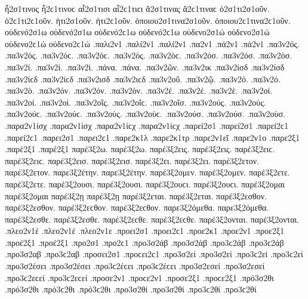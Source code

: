 {ἧ2σ1τινος ἧ2ϲ1τινοϲ   %
αἷ2σ1τισι αἷ2ϲ1τιϲι   %
ἅ2σ1τινας ἅ2ϲ1τιναϲ   %
ὁ2σ1τι2σ1οῦν. ὁ2ϲ1τι2ϲ1οῦν.   %
ἡτι2σ1οῦν. ἡτι2ϲ1οῦν.   %
ὁποιου2σ1τινα2σ1οῦν. ὁποιου2ϲ1τινα2ϲ1οῦν.   %
οὐδενό2σ1ω οὐδενό2σ1ω οὐδενό2ϲ1ω οὐδενό2ϲ1ω   %
οὐδενο2σ1ώ οὐδενο2σ1ώ οὐδενο2ϲ1ώ οὐδενο2ϲ1ώ 
.παλι2ν1   %
.παλί2ν1 .παλί2ν1   %
.πα2ν1 
.πά2ν1 .πά2ν1 
.πα3ν2ός. .πα3ν2ός. .πα3ν2όϲ. .πα3ν2όϲ.   %
.πα3ν2ὸς. .πα3ν2ὸϲ. 
.πα3ν2όσ. .πα3ν2όσ. 
.πα3ν2ὸσ. 
.πα3ν2ί. .πα3ν2ί. 
.πα3ν2ὶ. 
.πάνα. .πάνα. 
.πα3ν2ῶν. 
.πα3ν2ικ   %
.πα3ν2ίσδ .πα3ν2ίσδ .πα3ν2ίϲδ .πα3ν2ίϲδ   %
.πα3ν2ισδ .πα3ν2ιϲδ   %
.πα3ν2οῦ.   %
.πα3ν2ῷ. 
.πα3ν2ό. .πα3ν2ό. 
.πα3ν2ὸ. 
.πα3ν2όν. .πα3ν2όν. 
.πα3ν2ὸν. 
.πα3ν2έ. .πα3ν2έ. 
.πα3ν2ὲ. 
.πα3ν2οί. .πα3ν2οί. 
.πα3ν2οὶ. 
.πα3ν2οῖς. .πα3ν2οῖϲ. 
.πα3ν2οῖσ. 
.πα3ν2ούς. .πα3ν2ούς. .πα3ν2ούϲ. .πα3ν2ούϲ. 
.πα3ν2οὺς. .πα3ν2οὺϲ. 
.πα3ν2ούσ. .πα3ν2ούσ. 
.πα3ν2οὺσ. 
.παρα2ν1ίσχ .παρα2ν1ίσχ .παρα2ν1ίϲχ .παρα2ν1ίϲχ   %
.παρεί2σ1 .παρεί2σ1 .παρεί2ϲ1 .παρεί2ϲ1   %
.παρει2σ1 .παρει2ϲ1 
.παρε2κ1λ   %
.παρε2κ1τρ   %
.παρε2ν1εῖ   %
.παρε2ν1ο   %
.παρε2ξ1 
.παρέ2ξ1 .παρέ2ξ1 
παρέ3ξ2ω. παρέ3ξ2ω.   %
παρέ3ξ2εις. παρέ3ξ2εις. παρέ3ξ2ειϲ. παρέ3ξ2ειϲ. 
παρέ3ξ2εισ. παρέ3ξ2εισ. 
παρέ3ξ2ει. παρέ3ξ2ει. 
παρέ3ξ2ετον. παρέ3ξ2ετον. 
παρε3ξ2έτην. παρε3ξ2έτην. 
παρέ3ξ2ομεν. παρέ3ξ2ομεν. 
παρέ3ξ2ετε. παρέ3ξ2ετε. 
παρέ3ξ2ουσι. παρέ3ξ2ουσι. παρέ3ξ2ουϲι. παρέ3ξ2ουϲι. 
παρέ3ξ2ομαι παρέ3ξ2ομαι 
παρέ3ξ2ῃ παρέ3ξ2ῃ 
παρέ3ξ2εται. παρέ3ξ2εται. 
παρέ3ξ2εσθον. παρέ3ξ2εσθον. παρέ3ξ2εϲθον. παρέ3ξ2εϲθον. 
παρε3ξ2όμεθα. παρε3ξ2όμεθα. 
παρέ3ξ2εσθε. παρέ3ξ2εσθε. παρέ3ξ2εϲθε. παρέ3ξ2εϲθε. 
παρέ3ξ2ονται. παρέ3ξ2ονται. 
.πλεο2ν1έ .πλεο2ν1έ   %
.πλεο2ν1ε 
.προει2σ1 .προει2ϲ1   %
.προε2κ1   %
.προε2ν1   %
.προε2ξ1   %
.προέ2ξ1 .προέ2ξ1   %
.προ2σ1 .προ2ϲ1 
.προ3σ2άβ .προ3σ2άβ .προ3ϲ2άβ .προ3ϲ2άβ   %
.προ3σ2αβ .προ3ϲ2αβ 
.προσει2σ1 .προϲει2ϲ1   %
.προ3σ2εί .προ3σ2εί .προ3ϲ2εί .προ3ϲ2εί   %
.προ3σ2έσει .προ3σ2έσει .προ3ϲ2έϲει .προ3ϲ2έϲει 
.προ3σ2εσεί .προ3σ2εσεί .προ3ϲ2εϲεί .προ3ϲ2εϲεί 
.προσε2ν1 .προϲε2ν1   %
.προσε2ξ1 .προϲε2ξ1   %
.πρό3σ2θι .πρό3σ2θι .πρό3ϲ2θι .πρό3ϲ2θι   %
.προ3σ2θί .προ3σ2θί .προ3ϲ2θί .προ3ϲ2θί 
}

